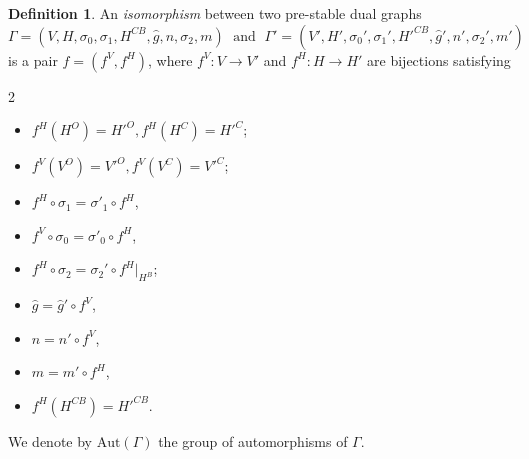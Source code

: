 \documentclass[11pt,a4paper]{article}
\theoremstyle{definition}
\newtheorem{definition}[dummy]{Definition}
\theoremstyle{remark}
\numberwithin{equation}{section}
\begin{document}
\begin{definition}
An \textit{isomorphism} between two pre-stable dual graphs
\[\Gamma = (V,H, \sigma_0,\sigma_1, H^{CB},\hat{g},n,\sigma_2,  m) \; \text{ and } \; \Gamma' = (V', H', \sigma_0',\sigma_1', H'^{CB},\hat{g}',n',\sigma_2',  m')\]
is a pair $f = (f^V, f^H)$, where
$f^V: V \to V'$ and $f^H: H \to H'$
are bijections satisfying
\begin{multicols}{2}
\begin{itemize}
\item $f^H(H^{O})=H'^{O},f^H(H^{C})=H'^{C}$;
\item $f^V(V^{O})=V'^{O},f^V(V^{C})=V'^{C}$;
\item $f^{H} \circ \sigma_1 =  \sigma'_1 \circ f^H$,
\item $f^{V} \circ \sigma_0 =  \sigma'_0 \circ f^H$,
\item $f^H\circ \sigma_2=\sigma_2'\circ f^H\vert_{H^B}$;
\item $\hat g=\hat g'\circ f^V$,
\item $n=n'\circ f^V$,
\item $m = m' \circ f^H$,
\item $f^H(H^{CB}) = H'^{CB}$.
\end{itemize}
\end{multicols}
We denote by $\text{Aut}(\Gamma)$ the group of automorphisms of $\Gamma$.
\end{definition}
\end{document}
